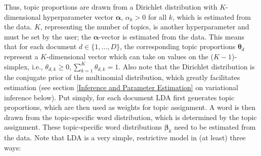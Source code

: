 \noindent
Thus, topic proportions are drawn from a Dirichlet distribution with $K$-dimensional hyperparameter vector $\boldsymbol{\alpha}$, $\alpha_k > 0$ for all $k$, which is estimated from the data. $K$, representing the number of topics, is another hyperparameter and must be set by the user; the $\boldsymbol{\alpha}$-vector is estimated from the data. This means that for each document $d \in \{1,\dots,D\}$, the corresponding topic proportions $\boldsymbol{\theta}_d$ represent a $K$-dimensional vector which can take on values on the ($K-1$)-simplex, i.e., $\theta_{d,k} \geq 0, \sum_{k=1}^{K}\theta_{d,k}=1$. Also note that the Dirichlet distribution is the conjugate prior of the multinomial distribution, which greatly facilitates estimation (see section \ref{Inference and Parameter Estimation} on variational inference below). Put simply, for each document LDA first generates topic proportions, which are then used as weights for topic assignment. A word is then drawn from the topic-specific word distribution, which is determined by the topic assignment. These topic-specific word distributions $\boldsymbol{\beta}_k$ need to be estimated from the data.
Note that LDA is a very simple, restrictive model in (at least) three ways:

